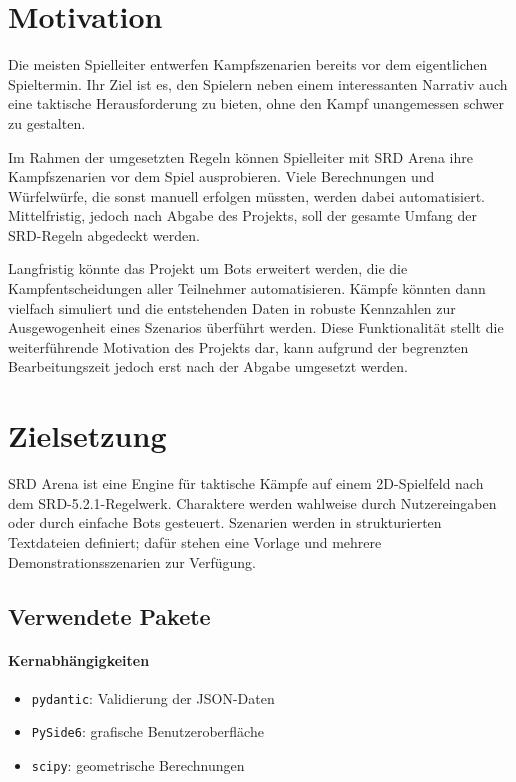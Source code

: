 \documentclass[
  12pt,
  a4paper,
  oneside,
  parskip=half,
  headings=normal
]{scrreprt}
\begin{document}
\section{Motivation}

Die meisten Spielleiter entwerfen Kampfszenarien bereits vor dem eigentlichen
Spieltermin. Ihr Ziel ist es, den Spielern neben einem interessanten Narrativ
auch eine taktische Herausforderung zu bieten, ohne den Kampf unangemessen
schwer zu gestalten.

Im Rahmen der umgesetzten Regeln können Spielleiter mit SRD Arena ihre
Kampfszenarien vor dem Spiel ausprobieren. Viele Berechnungen und Würfelwürfe,
die sonst manuell erfolgen müssten, werden dabei automatisiert. Mittelfristig,
jedoch nach Abgabe des Projekts, soll der gesamte Umfang der SRD-Regeln
abgedeckt werden.

Langfristig könnte das Projekt um Bots erweitert werden, die die
Kampfentscheidungen aller Teilnehmer automatisieren. Kämpfe könnten dann
vielfach simuliert und die entstehenden Daten in robuste Kennzahlen zur
Ausgewogenheit eines Szenarios überführt werden. Diese Funktionalität stellt
die weiterführende Motivation des Projekts dar, kann aufgrund der begrenzten
Bearbeitungszeit jedoch erst nach der Abgabe umgesetzt werden.

\section{Zielsetzung}

SRD Arena ist eine Engine für taktische Kämpfe auf einem 2D-Spielfeld nach dem
SRD-5.2.1-Regelwerk. Charaktere werden wahlweise durch Nutzereingaben oder
durch einfache Bots gesteuert. Szenarien werden in strukturierten Textdateien
definiert; dafür stehen eine Vorlage und mehrere Demonstrationsszenarien zur
Verfügung.

\subsection{Verwendete Pakete}

\paragraph{Kernabhängigkeiten}
\begin{itemize}
  \item \texttt{pydantic}: Validierung der JSON-Daten
  \item \texttt{PySide6}: grafische Benutzeroberfläche
  \item \texttt{scipy}: geometrische Berechnungen
\end{itemize}
\end{document}
